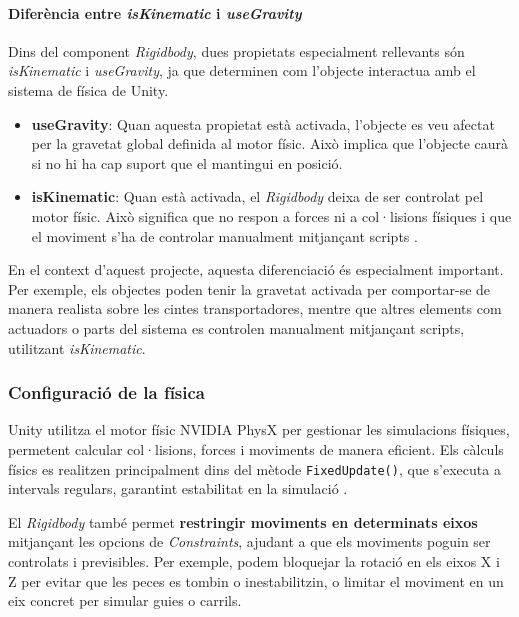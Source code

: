 \documentclass[a4paper,11pt,DIV=13,headings=normal,abstract=true,twoside=semi]{article}
\begin{document}
\paragraph{Diferència entre \textit{isKinematic} i \textit{useGravity}}

Dins del component \textit{Rigidbody}, dues propietats especialment rellevants són \textit{isKinematic} i \textit{useGravity}, ja que determinen com l'objecte interactua amb el sistema de física de Unity.

\begin{itemize}

\item \textbf{useGravity}:  
Quan aquesta propietat està activada, l'objecte es veu afectat per la gravetat global definida al motor físic. Això implica que l'objecte caurà si no hi ha cap suport que el mantingui en posició.

\item \textbf{isKinematic}:  
Quan està activada, el \textit{Rigidbody} deixa de ser controlat pel motor físic. Això significa que no respon a forces ni a col·lisions físiques i que el moviment s'ha de controlar manualment mitjançant scripts \cite{UnityRigidbody,UnityColliders}.

\end{itemize}


En el context d'aquest projecte, aquesta diferenciació és especialment important. Per exemple, els objectes poden tenir la gravetat activada per comportar-se de manera realista sobre les cintes transportadores, mentre que altres elements com actuadors o parts del sistema es controlen manualment mitjançant scripts, utilitzant \textit{isKinematic}.


\subsubsection*{Configuració de la física}

Unity utilitza el motor físic NVIDIA PhysX \cite{UnityPhysics} per gestionar les simulacions físiques, permetent calcular col·lisions, forces i moviments de manera eficient. Els càlculs físics es realitzen principalment dins del mètode \texttt{FixedUpdate()}, que s'executa a intervals regulars, garantint estabilitat en la simulació \cite{UnityUpdate}.

El \textit{Rigidbody} també permet \textbf{restringir moviments en determinats eixos} mitjançant les opcions de \textit{Constraints}, ajudant a que els moviments poguin ser controlats i previsibles. Per exemple, podem bloquejar la rotació en els eixos X i Z per evitar que les peces es tombin o inestabilitzin, o limitar el moviment en un eix concret per simular guies o carrils.
\end{document}
